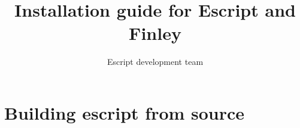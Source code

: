 \documentclass{manual}
\title{Installation guide for Escript and Finley}
\author{Escript development team}
\date{}
\begin{document}
\maketitle
\tableofcontents



% 
\chapter{Building escript from source}
\label{chap:essrc}
 
\end{document}
